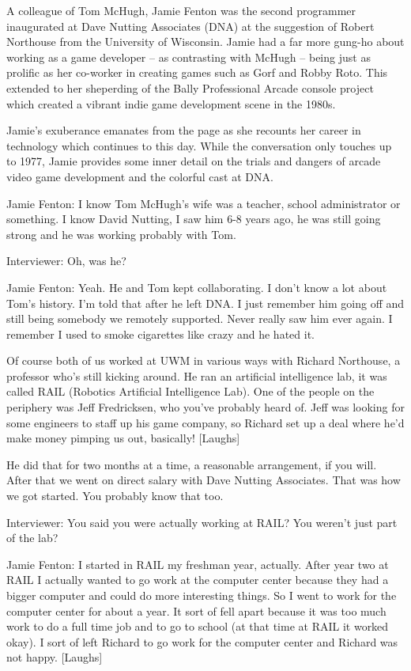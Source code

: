 A colleague of Tom McHugh, Jamie Fenton was the second programmer inaugurated at Dave Nutting Associates (DNA) at the suggestion of Robert Northouse from the University of Wisconsin. Jamie had a far more gung-ho about working as a game developer -- as contrasting with McHugh – being just as prolific as her co-worker in creating games such as Gorf and Robby Roto. This extended to her sheperding of the Bally Professional Arcade console project which created a vibrant indie game development scene in the 1980s.

Jamie’s exuberance emanates from the page as she recounts her career in technology which continues to this day. While the conversation only touches up to 1977, Jamie provides some inner detail on the trials and dangers of arcade video game development and the colorful cast at DNA.

\textcolor{interviewee}{Jamie Fenton:} I know Tom McHugh’s wife was a teacher, school administrator or something. I know David Nutting, I saw him 6-8 years ago, he was still going strong and he was working probably with Tom.

\textcolor{interviewer}{Interviewer:} Oh, was he?

\textcolor{interviewee}{Jamie Fenton:} Yeah. He and Tom kept collaborating. I don’t know a lot about Tom’s history. I’m told that after he left DNA. I just remember him going off and still being somebody we remotely supported. Never really saw him ever again. I remember I used to smoke cigarettes like crazy and he hated it.

Of course both of us worked at UWM in various ways with Richard Northouse, a professor who’s still kicking around. He ran an artificial intelligence lab, it was called RAIL (Robotics Artificial Intelligence Lab). One of the people on the periphery was Jeff Fredricksen, who you’ve probably heard of. Jeff was looking for some engineers to staff up his game company, so Richard set up a deal where he’d make money pimping us out, basically! [Laughs]

He did that for two months at a time, a reasonable arrangement, if you will. After that we went on direct salary with Dave Nutting Associates. That was how we got started. You probably know that too.

\textcolor{interviewer}{Interviewer:} You said you were actually working at RAIL? You weren’t just part of the lab?

\textcolor{interviewee}{Jamie Fenton:} I started in RAIL my freshman year, actually. After year two at RAIL I actually wanted to go work at the computer center because they had a bigger computer and could do more interesting things. So I went to work for the computer center for about a year. It sort of fell apart because it was too much work to do a full time job and to go to school (at that time at RAIL it worked okay). I sort of left Richard to go work for the computer center and Richard was not happy. [Laughs]

